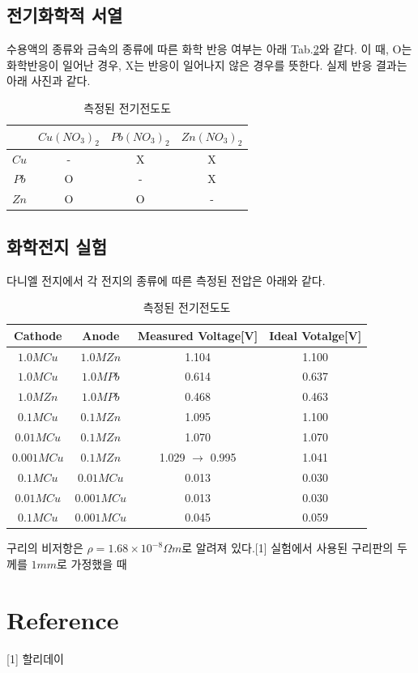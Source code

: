 \documentclass[%
 reprint,
 amsmath,amssymb,
 aps,
]{revtex4-2}
\begin{document}
\subsection{\label{sec:level2}전기화학적 서열}
수용액의 종류와 금속의 종류에 따른 화학 반응 여부는 아래 Tab.\ref{tab:chemreaction}와 같다. 이 때, O는 화학반응이 일어난 경우, X는 반응이 일어나지 않은 경우를 뜻한다. 실제 반응 결과는 아래 사진과 같다.
\begin{table}[]
\begin{tabular}{c|c|c|c} \hline \hline
 & $Cu(NO_{3})_{2}$ & $Pb(NO_{3})_{2}$ & $Zn(NO_{3})_{2}$ \\ \hline
$Cu$ & - & X & X\\ \hline
$Pb$ & O & - & X\\ \hline
$Zn$ & O & O & - \\  \hline \hline 
\end{tabular}
\caption{\label{tab:chemreaction}측정된 전기전도도}
\end{table}

\subsection{\label{sec:level2}화학전지 실험}
다니엘 전지에서 각 전지의 종류에 따른 측정된 전압은 아래와 같다.
\begin{table}[]
\begin{tabular}{c|c|c|c} \hline \hline
 Cathode & Anode & Measured Voltage[V] & Ideal Votalge[V] \\ \hline
$1.0M Cu$ & $1.0M Zn$ & 1.104 & 1.100 \\ \hline
$1.0M Cu$ & $1.0M Pb$ & 0.614 & 0.637 \\  \hline
$1.0M Zn$ & $1.0M Pb$ & 0.468 & 0.463 \\ \hline
$0.1M Cu$ & $0.1M Zn$ & 1.095 & 1.100 \\ \hline
$0.01M Cu$ & $0.1M Zn$ & 1.070 & 1.070 \\ \hline
$0.001M Cu$ & $0.1M Zn$ & 1.029 $\rightarrow$ 0.995 & 1.041 \\ \hline
$0.1M Cu$ & $0.01M Cu$ & 0.013 & 0.030\\ \hline
$0.01M Cu$ & $0.001M Cu$ & 0.013 & 0.030 \\ \hline
$0.1M Cu$ & $0.001M Cu$ & 0.045 & 0.059 \\ \hline \hline 
\end{tabular}
\caption{\label{tab:chemreaction}측정된 전기전도도}
\end{table}
구리의 비저항은 $\rho = 1.68 \times 10^{-8} \Omega m$로 알려져 있다.[1] 실험에서 사용된 구리판의 두께를 $1mm$로 가정했을 때


\section{\label{sec:level1}Reference}
[1] 할리데이
\end{document}
